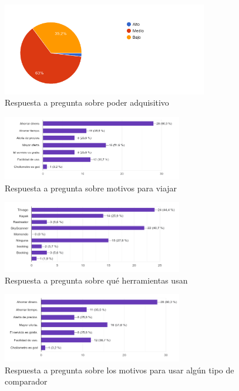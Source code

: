     \begin{figure}[H]
        \centering 
        \includegraphics[width=0.8\textwidth]{./Imagenes/Cuestionario/economia.png}
        \caption{Respuesta a pregunta sobre poder adquisitivo}
        \label{fig:economia}
    \end{figure}
    
    \begin{figure}[H]
        \centering 
        \includegraphics[width=0.7\textwidth]{./Imagenes/Cuestionario/motivo.png}
        \caption{Respuesta a pregunta sobre motivos para viajar}
        \label{fig:motivo}
    \end{figure}
    
    \begin{figure}[H]
        \centering 
        \includegraphics[width=0.7\textwidth]{./Imagenes/Cuestionario/herramientas.png}
        \caption{Respuesta a pregunta sobre qué herramientas usan}
        \label{fig:herramientas}
    \end{figure}

    
    \begin{figure}[H]
        \centering 
        \includegraphics[width=0.7\textwidth]{./Imagenes/Cuestionario/motivos_2.png}
        \caption{Respuesta a pregunta sobre los motivos para usar algún tipo de comparador}
        \label{fig:motivos2}
    \end{figure}


